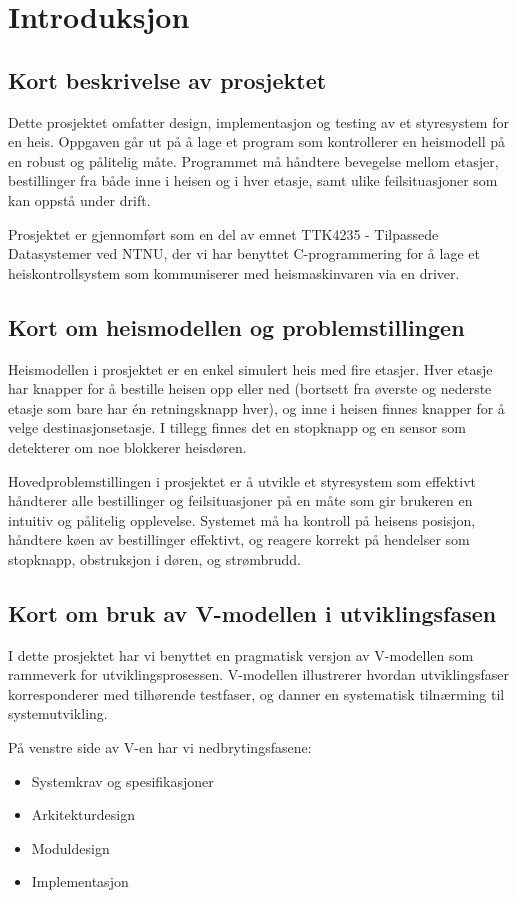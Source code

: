 \chapter{Introduksjon}
\section{Kort beskrivelse av prosjektet}
Dette prosjektet omfatter design, implementasjon og testing av et styresystem for en heis. Oppgaven går ut på å lage et program som kontrollerer en heismodell på en robust og pålitelig måte. Programmet må håndtere bevegelse mellom etasjer, bestillinger fra både inne i heisen og i hver etasje, samt ulike feilsituasjoner som kan oppstå under drift.

Prosjektet er gjennomført som en del av emnet TTK4235 - Tilpassede Datasystemer ved NTNU, der vi har benyttet C-programmering for å lage et heiskontrollsystem som kommuniserer med heismaskinvaren via en driver.

\section{Kort om heismodellen og problemstillingen}
Heismodellen i prosjektet er en enkel simulert heis med fire etasjer. Hver etasje har knapper for å bestille heisen opp eller ned (bortsett fra øverste og nederste etasje som bare har én retningsknapp hver), og inne i heisen finnes knapper for å velge destinasjonsetasje. I tillegg finnes det en stopknapp og en sensor som detekterer om noe blokkerer heisdøren.

Hovedproblemstillingen i prosjektet er å utvikle et styresystem som effektivt håndterer alle bestillinger og feilsituasjoner på en måte som gir brukeren en intuitiv og pålitelig opplevelse. Systemet må ha kontroll på heisens posisjon, håndtere køen av bestillinger effektivt, og reagere korrekt på hendelser som stopknapp, obstruksjon i døren, og strømbrudd.

\section{Kort om bruk av V-modellen i utviklingsfasen}
I dette prosjektet har vi benyttet en pragmatisk versjon av V-modellen som rammeverk for utviklingsprosessen. V-modellen illustrerer hvordan utviklingsfaser korresponderer med tilhørende testfaser, og danner en systematisk tilnærming til systemutvikling.

På venstre side av V-en har vi nedbrytingsfasene:
\begin{itemize}
    \item Systemkrav og spesifikasjoner
    \item Arkitekturdesign
    \item Moduldesign
    \item Implementasjon
\end{itemize}

